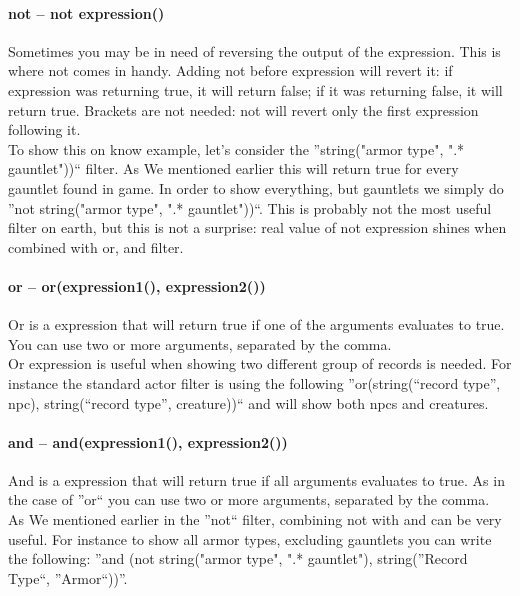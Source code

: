 \paragraph{not -- not expression()}
Sometimes you may be in need of reversing the output of the expression. This is where not comes in handy. Adding not before expression will revert it: if expression was returning true, it will return false; if it was returning false, it will return true. Brackets are not needed: not will revert only the first expression following it.\\
To show this on know example, let's consider the ''string("armor type", ".* gauntlet"))`` filter. As We mentioned earlier this will return true for every gauntlet found in game. In order to show everything, but gauntlets we simply do ''not string("armor type", ".* gauntlet"))``. This is probably not the most useful filter on earth, but this is not a surprise: real value of not expression shines when combined with or, and filter.

\paragraph{or -- or(expression1(), expression2())}
Or is a expression that will return true if one of the arguments evaluates to true. You can use two or more arguments, separated by the comma.\\
Or expression is useful when showing two different group of records is needed. For instance the standard actor filter is using the following ''or(string(``record type'', npc), string(``record type'', creature))`` and will show both npcs and creatures.

\paragraph{and -- and(expression1(), expression2())}
And is a expression that will return true if all arguments evaluates to true. As in the case of ''or`` you can use two or more arguments, separated by the comma.\\
As We mentioned earlier in the ''not`` filter, combining not with and can be very useful. For instance to show all armor types, excluding gauntlets you can write the following: ''and (not string("armor type", ".* gauntlet"), string(''Record Type``, ''Armor``))''.